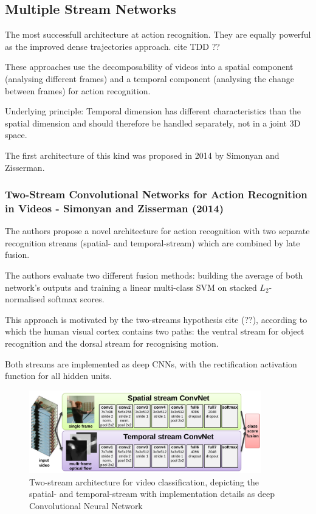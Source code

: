 \newpage
\subsection{Multiple Stream Networks}
The most successfull architecture at action recognition. They are equally powerful as the improved dense trajectories approach. cite TDD ??

These approaches use the decomposability of videos into a spatial component (analysing different frames) and a temporal component (analysing the change between frames) for action recognition.

Underlying principle: Temporal dimension has different characteristics than the spatial dimension and should therefore be handled separately, not in a joint 3D space.

The first architecture of this kind was proposed in 2014 by Simonyan and Zisserman.


\subsubsection{Two-Stream Convolutional Networks for Action Recognition in Videos - Simonyan and Zisserman (2014)}

The authors propose a novel architecture for action recognition with two separate recognition streams (spatial- and temporal-stream) which are combined by late fusion.

The authors evaluate two different fusion methods: building the average of both network's outputs and training a linear multi-class SVM on stacked $L_2$-normalised softmax scores.

This approach is motivated by the two-streams hypothesis cite (??), according to which the human visual cortex contains two paths: the ventral stream for object recognition and the dorsal stream for recognising motion.

Both streams are implemented as deep CNNs, with the rectification activation function for all hidden units.

\begin{figure}[H]
    \centering
    \includegraphics[width=0.9\textwidth]{img_deep/twostream_architecture}
    \caption{Two-stream architecture for video classification, depicting the spatial- and temporal-stream with implementation details as deep Convolutional Neural Network \cite{simonyan_two-stream_2014}}
    \label{fig:twostream_architecture}
\end{figure}

